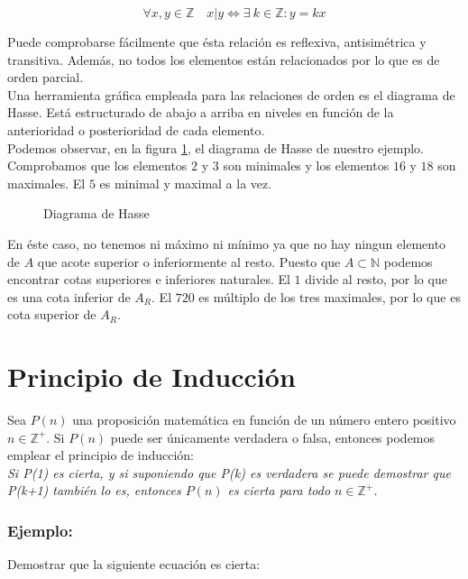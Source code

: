 $$
\forall x,y \in \mathbb{Z}\quad x|y \Leftrightarrow \exists \  k \in \mathbb{Z}: y=kx
$$

Puede comprobarse fácilmente que ésta relación es reflexiva, antisimétrica y transitiva. Además, no todos los elementos están relacionados por lo que es de orden parcial.\\

Una herramienta gráfica empleada para las relaciones de orden es el diagrama de Hasse. Está estructurado de abajo a arriba en niveles en función de la anterioridad o posterioridad de cada elemento.\\

Podemos observar, en la figura \ref{hasse}, el diagrama de Hasse de nuestro ejemplo. Comprobamos que los elementos $2$ y $3$ son minimales y los elementos $16$ y $18$ son maximales. El $5$ es minimal y maximal a la vez.\\


\begin{figure}[h]
\centering

\caption{Diagrama de Hasse}
\label{hasse}
\end{figure}

\newpage

En éste caso, no tenemos ni máximo ni mínimo ya que no hay ningun elemento de $A$ que acote superior o inferiormente al resto. Puesto que $A\subset \mathbb{N}$ podemos encontrar cotas superiores e inferiores naturales. El $1$  divide al resto, por lo que es una cota inferior de $A_R$. El $720$ es múltiplo de los tres maximales, por lo que es cota superior de $A_R$.\\

\section{Principio de Inducción}

Sea $P(n)$ una proposición matemática en función de un número entero positivo $n\in \mathbb{Z}^+$. Si $P(n)$ puede ser únicamente verdadera o falsa, entonces podemos emplear el principio de inducción:\\

\emph{Si P(1) es cierta, y si suponiendo que P(k) es verdadera se puede demostrar que P(k+1) también lo es, entonces $P(n)$ es cierta para todo $n\in \mathbb{Z}^+$.}

\subsubsection*{Ejemplo:}
Demostrar que la siguiente ecuación es cierta:

